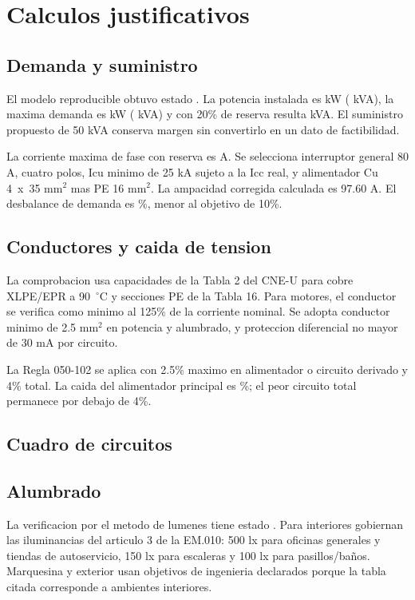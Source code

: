 \chapter{Calculos justificativos}
\thispagestyle{memoria}\pagestyle{memoria}

\section{Demanda y suministro}
El modelo reproducible obtuvo estado \textbf{\EstadoCalculo}. La potencia instalada es \PotenciaInstaladaKW{} kW (\PotenciaInstaladaKVA{} kVA), la maxima demanda es \MaximaDemandaKW{} kW (\MaximaDemandaKVA{} kVA) y con 20\% de reserva resulta \DemandaReservaKVA{} kVA. El suministro propuesto de 50 kVA conserva margen sin convertirlo en un dato de factibilidad.

La corriente maxima de fase con reserva es \CorrienteMaximaA{} A. Se selecciona interruptor general 80 A, cuatro polos, Icu minimo de 25 kA sujeto a la Icc real, y alimentador Cu 4~x~35 mm\(^2\) mas PE 16 mm\(^2\). La ampacidad corregida calculada es 97.60 A. El desbalance de demanda es \DesbalanceFases\%, menor al objetivo de 10\%.

\section{Conductores y caida de tension}
La comprobacion usa capacidades de la Tabla 2 del CNE-U para cobre XLPE/EPR a 90~\(^\circ\)C y secciones PE de la Tabla 16. Para motores, el conductor se verifica como minimo al 125\% de la corriente nominal. Se adopta conductor minimo de 2.5 mm\(^2\) en potencia y alumbrado, y proteccion diferencial no mayor de 30 mA por circuito.

La Regla 050-102 se aplica con 2.5\% maximo en alimentador o circuito derivado y 4\% total. La caida del alimentador principal es \CaidaPrincipal\%; el peor circuito total permanece por debajo de 4\%.



\section{Cuadro de circuitos}
\small

\normalsize

\section{Alumbrado}
La verificacion por el metodo de lumenes tiene estado \textbf{\EstadoAlumbrado}. Para interiores gobiernan las iluminancias del articulo 3 de la EM.010: 500 lx para oficinas generales y tiendas de autoservicio, 150 lx para escaleras y 100 lx para pasillos/baños. Marquesina y exterior usan objetivos de ingenieria declarados porque la tabla citada corresponde a ambientes interiores.

